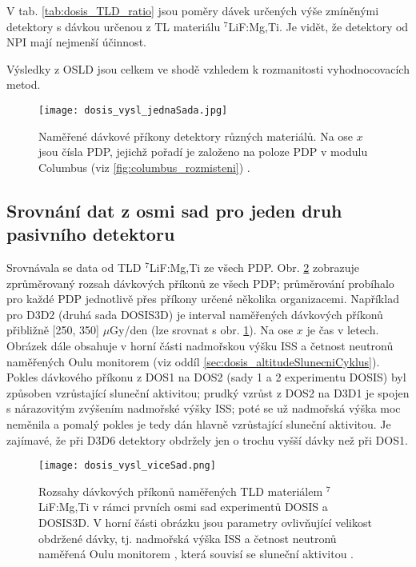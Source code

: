 V tab. \ref{tab:dosis_TLD_ratio} jsou poměry dávek určených výše zmíněnými detektory s dávkou určenou z TL materiálu $^7$LiF:Mg,Ti. Je vidět, že detektory od NPI mají nejmenší účinnost.

Výsledky z OSLD jsou celkem ve shodě vzhledem k rozmanitosti vyhodnocovacích metod.
\begin{figure}[!t]
  \centering
  \texttt{[image: dosis\_vysl\_jednaSada.jpg]}
  \caption{Naměřené dávkové příkony detektory různých materiálů. Na ose $x$ jsou čísla PDP, jejichž pořadí je založeno na poloze PDP v modulu Columbus (viz \ref{fig:columbus_rozmisteni}) \cite{dosis}.}
  \label{fig:dosis_vysl_jednaSada}
\end{figure}
\subsection{Srovnání dat z osmi sad pro jeden druh pasivního detektoru}
Srovnávala se data od TLD $^7$LiF:Mg,Ti ze všech PDP. Obr. \ref{fig:dosis_vysl_viceSad} zobrazuje zprůměrovaný rozsah dávkových příkonů ze všech PDP; průměrování probíhalo pro každé PDP jednotlivě přes příkony určené několika organizacemi.
Například pro D3D2 (druhá sada DOSIS3D) je interval naměřených dávkových příkonů přibližně [250, 350] $\mu$Gy/den (lze srovnat s obr. \ref{fig:dosis_vysl_jednaSada}). Na ose $x$ je čas v letech. Obrázek dále obsahuje v horní části nadmořskou výšku ISS a četnost neutronů naměřených Oulu monitorem (viz oddíl \ref{sec:dosis_altitudeSlunecniCyklus}). Pokles dávkového příkonu z DOS1 na DOS2 (sady 1 a 2 experimentu DOSIS) byl způsoben vzrůstající sluneční aktivitou; prudký vzrůst z DOS2 na D3D1 je spojen s nárazovitým zvýšením nadmořské výšky ISS; poté se už nadmořská výška moc neměnila a pomalý pokles je tedy dán
hlavně vzrůstající sluneční aktivitou. Je zajímavé, že při D3D6 detektory obdržely jen o trochu vyšší dávky než při DOS1.
\begin{figure}[h]
  \centering
  \texttt{[image: dosis\_vysl\_viceSad.png]}
  \caption{Rozsahy dávkových příkonů naměřených TLD materiálem $^7$LiF:Mg,Ti v rámci prvních osmi sad experimentů DOSIS a DOSIS3D. V horní části obrázku jsou parametry ovlivňující velikost obdržené dávky, tj. nadmořská výška ISS a četnost neutronů naměřená Oulu monitorem \cite{dosis_oulu}, která souvisí se sluneční aktivitou \cite{dosis}.}
  \label{fig:dosis_vysl_viceSad}
\end{figure}

